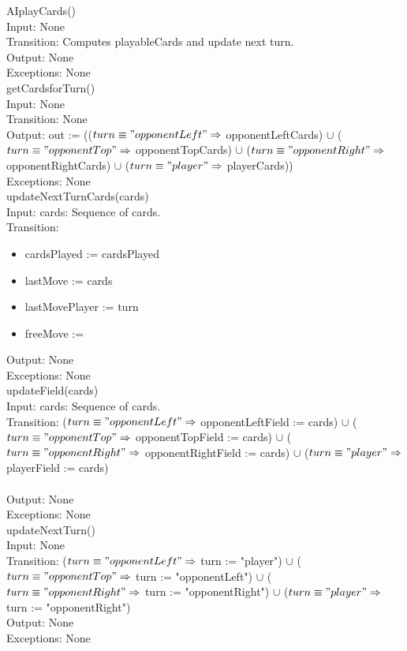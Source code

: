 \documentclass[12pt, titlepage]{article}
\begin{document}
\noindent AIplayCards()\\
Input: None\\
Transition: Computes playableCards and update next turn.\\
Output: None\\
Exceptions: None \\

\noindent getCardsforTurn()\\
Input: None\\
Transition: None \\
Output: out := (($turn \equiv "opponentLeft" \Rightarrow$ opponentLeftCards) $\cup$ ($turn \equiv "opponentTop" \Rightarrow$ opponentTopCards) $\cup$ ($turn \equiv "opponentRight" \Rightarrow$ opponentRightCards) $\cup$ ($turn \equiv "player" \Rightarrow$ playerCards))\\
Exceptions: None \\

\noindent  updateNextTurnCards(cards)\\
Input: cards: Sequence of cards.\\
Transition: 
\begin{itemize}
                \item cardsPlayed := cardsPlayed
                \item lastMove := cards
                \item lastMovePlayer := turn
                \item freeMove :=
\end{itemize}        
Output: None\\
Exceptions: None \\

\noindent updateField(cards)\\
Input: cards: Sequence of cards.\\
Transition: ($turn \equiv "opponentLeft" \Rightarrow$ opponentLeftField := cards) $\cup$ ($turn \equiv "opponentTop" \Rightarrow$ opponentTopField := cards) $\cup$ ($turn \equiv "opponentRight" \Rightarrow$ opponentRightField := cards) $\cup$ ($turn \equiv "player" \Rightarrow$ playerField := cards)\\\\
Output: None\\
Exceptions: None \\

\noindent updateNextTurn()  \\
Input: None\\
Transition: ($turn \equiv "opponentLeft" \Rightarrow$ turn := "player") $\cup$ ($turn \equiv "opponentTop" \Rightarrow$ turn := "opponentLeft") $\cup$ ($turn \equiv "opponentRight" \Rightarrow$ turn := "opponentRight") $\cup$ ($turn \equiv "player" \Rightarrow$ turn := "opponentRight")\\
Output: None\\
Exceptions: None \\
\end{document}
